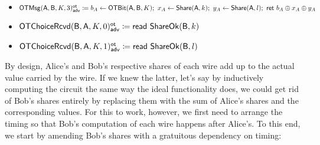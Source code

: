 \begin{itemize}
\begin{itemize}
\item {\color{blue} $\mathsf{OTMsg}(\mathsf{A},\mathsf{B},K,3)^{\mathsf{ot}}_{\mathsf{adv}} \coloneqq b_A \leftarrow \mathsf{OTBit}(\mathsf{A},\mathsf{B},K); \ x_A \leftarrow \mathsf{Share}(\mathsf{A},k); \ y_A \leftarrow \mathsf{Share}(\mathsf{A},l); \ \mathsf{ret} \ b_A \oplus x_A \oplus y_A$}\medskip
\item {\color{red} $\mathsf{OTChoiceRcvd}(\mathsf{B},\mathsf{A},K,0)^{\mathsf{ot}}_{\mathsf{adv}} \coloneqq \mathsf{read} \ \mathsf{ShareOk}(\mathsf{B},k)$}
\item {\color{red} $\mathsf{OTChoiceRcvd}(\mathsf{B},\mathsf{A},K,1)^{\mathsf{ot}}_{\mathsf{adv}} \coloneqq \mathsf{read} \ \mathsf{ShareOk}(\mathsf{B},l)$}
\end{itemize}
\end{itemize}

\noindent By design, Alice's and Bob's respective shares of each wire add up to the actual value carried by the wire. If we knew the latter, let's say by inductively computing the circuit the same way the ideal functionality does, we could get rid of Bob's shares entirely by replacing them with the sum of Alice's shares and the corresponding values. For this to work, however, we first need to arrange the timing so that Bob's computation of each wire happens after Alice's. To this end, we start by amending Bob's shares with a gratuitous dependency on timing:

